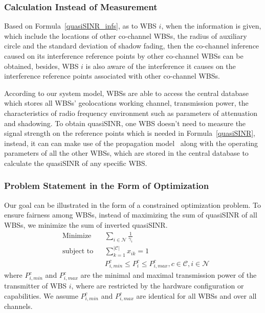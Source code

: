 \subsubsection*{Calculation Instead of Measurement}
Based on Formula~\ref{quasiSINR_infs}, as to WBS $i$, when the information is given, which include the locations of other co-channel WBSs, the radius of auxiliary circle and the standard deviation of shadow fading, then the co-channel inference caused on its interference reference points by other co-channel WBSs can be obtained, besides, WBS $i$ is also aware of the interference it causes on the interference reference points associated with other co-channel WBSs.


According to our system model, WBSs are able to access the central database which stores all WBSs' geolocations \ie working channel, transmission power, the characteristics of radio frequency environment such as parameters of attenuation and shadowing.
To obtain quasiSINR, one WBS doesn't need to measure the signal strength on the reference points which is needed in Formula~\ref{quasiSINR}, instead, it can can make use of the propagation model~\cite{Jaentti11} along with the operating parameters of all the other WBSs, which are stored in the central database to calculate the quasiSINR of any specific WBS.



\subsubsection*{Problem Statement in the Form of Optimization}
Our goal can be illustrated in the form of a constrained optimization problem.
To ensure fairness among WBSs, instead of maximizing the sum of quasiSINR of all WBSs, we minimize the sum of inverted quasiSINR. 
	\begin{equation}
\label{problem}
			\begin{aligned}
			& {\text{Minimize}}
			& & \sum_{i\in \mathcal{N}}\frac{1}{\gamma_{i}} \\
			& \text{subject to}
			& & \sum_{k=1}^{|\mathcal{C}|}x_{ik}=1 \\
			& & & P_{i,min}^c \leq P_i^c \leq P_{i,max}^c, c \in \mathcal{C}, i\in \mathcal{N}
			\end{aligned}
		\end{equation}
		where $P_{i,min}^c$ and $P_{i,max}^c$ are the minimal and maximal transmission power of the transmitter of WBS $i$, where are restricted by the hardware configuration or capabilities.
We assume $P_{i,min}^c$ and $P_{i,max}^c$ are identical for all WBSs and over all channels.

